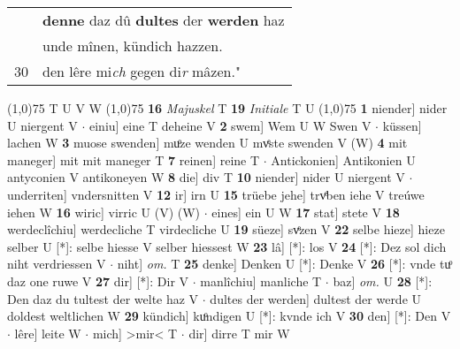 \documentclass[8pt,a4paper,notitlepage]{article}
\begin{document}
\begin{table}[ht]
\begin{minipage}[t]{0.5\linewidth}
\begin{tabular}{rl}
 & \textbf{denne} daz dû \textbf{dultes} der \textbf{werden} haz\\ 
 & unde mînen, kündich hazzen.\\ 
30 & den lêre mi\textit{ch} gegen di\textit{r} mâzen."\\ 
\end{tabular}
\scriptsize
\line(1,0){75} \newline
T U V W \newline
\line(1,0){75} \newline
\textbf{16} \textit{Majuskel} T  \textbf{19} \textit{Initiale} T U  \newline
\line(1,0){75} \newline
\textbf{1} niender] nider U niergent V  $\cdot$ einiu] eine T deheine V \textbf{2} swem] Wem U W Swen V  $\cdot$ küssen] lachen W \textbf{3} muose swenden] muͦze wenden U mvͤste swenden V (W) \textbf{4} mit maneger] mit mit maneger T \textbf{7} reinen] reine T  $\cdot$ Antickonien] Antikonien U antyconien V antikoneyen W \textbf{8} die] div T \textbf{10} niender] nider U niergent V  $\cdot$ underriten] vndersnitten V \textbf{12} ir] irn U \textbf{15} trüebe jehe] trvͤben iehe V treúwe iehen W \textbf{16} wiric] virric U (V) (W)  $\cdot$ eines] ein U W \textbf{17} stat] stete V \textbf{18} werdeclîchiu] werdecliche T virdecliche U \textbf{19} süeze] svͤzen V \textbf{22} selbe hieze] hieze selber U [*]: selbe hiesse V selber hiessest W \textbf{23} lâ] [*]: los V \textbf{24} [*]: Dez sol dich niht verdriessen V  $\cdot$ niht] \textit{om.} T \textbf{25} denke] Denken U [*]: Denke V \textbf{26} [*]: vnde tuͦ daz one ruwe V \textbf{27} dir] [*]: Dir V  $\cdot$ manlîchiu] manliche T  $\cdot$ baz] \textit{om.} U \textbf{28} [*]: Den daz du tultest der welte haz V  $\cdot$ dultes der werden] dultest der werde U doldest weltlichen W \textbf{29} kündich] kuͦndigen U [*]: kvnde ich V \textbf{30} den] [*]: Den V  $\cdot$ lêre] leite W  $\cdot$ mich] >mir< T  $\cdot$ dir] dirre T mir W \newline
\end{minipage}
\end{table}
\end{document}
